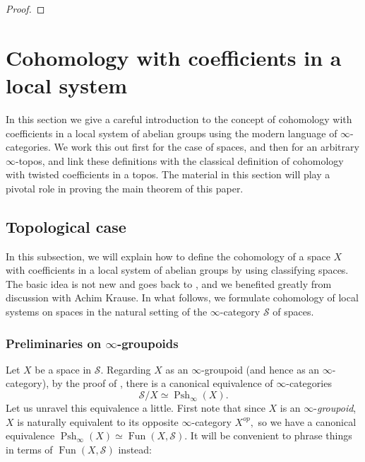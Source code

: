 \documentclass[12pt]{amsart}
\theoremstyle{definition}
\newcommand{\cS}{\mathcal{S}}
\newcommand{\cU}{\mathcal{U}}
\newcommand{\Topi}{\mathfrak{Top}_\i}
\newcommand{\Spec}{\mathrm{Spec}\,}
\newcommand{\Sh}{\operatorname{Sh}}
\newcommand{\Hom}{\mathrm{Hom}}
\newcommand{\et}{\acute{e}t}
\def\Sch{\mathbf{Sch}}
\renewcommand{\i}{\infty}
\def\Pro{\operatorname{Pro}}
\def\Fun{\operatorname{Fun}}
\def\Pshi{\operatorname{Psh}_\i}
\def\Shi{\Sh_\i}
\def\blank{\mspace{3mu}\cdot\mspace{3mu}}
\def\Shape{\mathit{Shape}}
\def\Dmsch{\mathfrak{DM}\Sch^\cU_k}
\begin{document}
\begin{proof}
\end{proof}

\section{Cohomology with coefficients in a local system}\label{sec: cohomology}
In this section we give a careful introduction to the concept of cohomology with coefficients in a local system of abelian groups using the modern language of $\i$-categories. We work this out first for the case of spaces, and then for an arbitrary $\i$-topos, and link these definitions with the classical definition of cohomology with twisted coefficients in a topos. The material in this section will play a pivotal role in proving the main theorem of this paper.

\subsection{Topological case}
In this subsection, we will explain how to define the cohomology of a space $X$ with coefficients in a local system of abelian groups by using classifying spaces. The basic idea is not new and goes back to \cite{robinson,coh}, and we benefited greatly from discussion with Achim Krause. In what follows, we formulate cohomology of local systems on spaces in the natural setting of the $\i$-category $\cS$ of spaces.

\subsubsection{Preliminaries on $\i$-groupoids}

Let $X$ be a space in $\cS.$ Regarding $X$ as an $\i$-groupoid (and hence as an $\i$-category), by the proof of \cite[Corollary 5.3.5.4]{htt}, there is a canonical equivalence of $\i$-categories $$\cS/X \simeq \Pshi\left(X\right).$$ Let us unravel this equivalence a little. First note that since $X$ is an $\i$-\emph{groupoid}, $X$ is naturally equivalent to its opposite $\i$-category $X^{op},$ so we have a canonical equivalence $\Pshi\left(X\right)\simeq \Fun\left(X,\cS\right).$ It will be convenient to phrase things in terms of $\Fun\left(X,\cS\right)$ instead:\\
\end{document}
